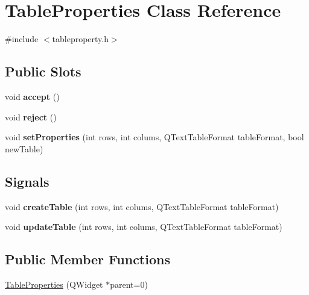 \hypertarget{classTableProperties}{
\section{TableProperties Class Reference}
\label{classTableProperties}
}


{\ttfamily \#include $<$tableproperty.h$>$}

\subsection*{Public Slots}
\begin{DoxyCompactItemize}
\item 
\hypertarget{classTableProperties_ac4e67b2d7f7bdbe543046b249452a1d8}{
void {\bfseries accept} ()}
\label{classTableProperties_ac4e67b2d7f7bdbe543046b249452a1d8}

\item 
\hypertarget{classTableProperties_aafcf3812d777de38b7bde57ad9144f89}{
void {\bfseries reject} ()}
\label{classTableProperties_aafcf3812d777de38b7bde57ad9144f89}

\item 
\hypertarget{classTableProperties_a3118ba8dcc66274adddcf8c56270c9b7}{
void {\bfseries setProperties} (int rows, int colums, QTextTableFormat tableFormat, bool newTable)}
\label{classTableProperties_a3118ba8dcc66274adddcf8c56270c9b7}

\end{DoxyCompactItemize}
\subsection*{Signals}
\begin{DoxyCompactItemize}
\item 
\hypertarget{classTableProperties_aec2c997c54ba742b10bd15109b0be823}{
void {\bfseries createTable} (int rows, int colums, QTextTableFormat tableFormat)}
\label{classTableProperties_aec2c997c54ba742b10bd15109b0be823}

\item 
\hypertarget{classTableProperties_a3d9e19de90b28500d3aac935662f8c30}{
void {\bfseries updateTable} (int rows, int colums, QTextTableFormat tableFormat)}
\label{classTableProperties_a3d9e19de90b28500d3aac935662f8c30}

\end{DoxyCompactItemize}
\subsection*{Public Member Functions}
\begin{DoxyCompactItemize}
\item 
\hyperlink{classTableProperties_a4ab9bf530b6a7f194d4bfd681f3bd94e}{TableProperties} (QWidget $\ast$parent=0)
\end{DoxyCompactItemize}


